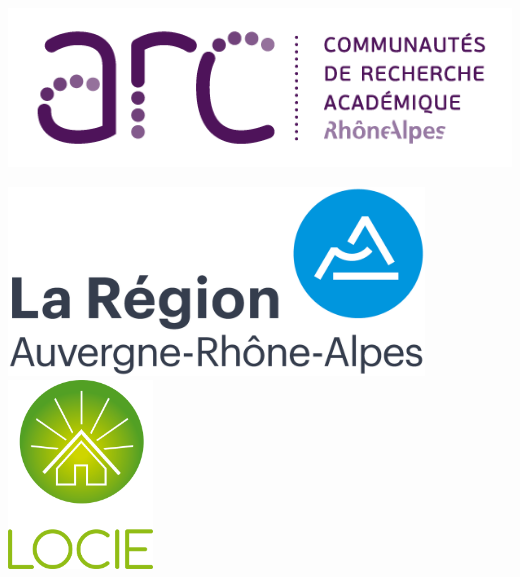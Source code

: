 \documentclass[a0,portrait]{a0poster}
\begin{document}
\begin{minipage}[b]{0.5\linewidth}
\begin{flushright}
	\includegraphics[height=5cm]{logo-arc-72dpi}
    \hspace{1cm}
    \includegraphics[height=5cm]{logo-ara}
	\hspace{1cm}
	\includegraphics[height=5cm]{locie-logo}
\end{flushright}
\vspace{10cm}
\end{minipage}

\vspace{1cm} %


\color{DarkSlateGray} %
\end{document}
